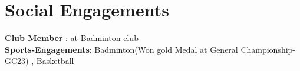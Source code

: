 \section{Social Engagements}
    \begin{itemize}[leftmargin=0.15in, label={}]
	\small{\item{
            \textbf{Club Member}{ : at Badminton club } \\
        \textbf{Sports-Engagements}{: Badminton(Won gold Medal at General Championship-GC23) , Basketball}
	}}
    \end{itemize}